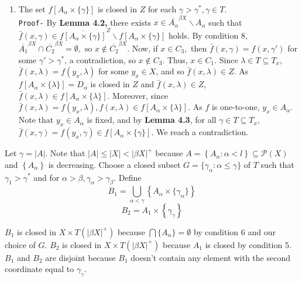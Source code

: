 \documentclass{article}
\begin{document}
\begin{enumerate}
																																																			    \item The set $f\left[A_\alpha\times\{\gamma\}\right]$ is closed in $Z$ for each $\gamma>\gamma^*, \gamma\in T$.\\
																																																				\texttt{Proof-} By \textbf{Lemma 4.2,} there exists $x\in \overline{A_\alpha}^{\beta X}\backslash A_\alpha$ such that $\bar{f}(x,\gamma)\in \overline{f\left[A_\alpha\times\{\gamma\}\right]}^Z \backslash f\left[A_\alpha\times \{\gamma\}\right]$ holds. By condition 8, $\overline{A_1}^{\beta X} \cap \overline{C_2}^{\beta X}=\emptyset, \mbox{ so }x\notin \overline{C_2}^{\beta X}.$ Now, if $x\in C_3,$ then $\bar{f}(x,\gamma)=f(x,\gamma')$ for some $\gamma'>\gamma^*$, a contradiction, so $x\notin C_3$. Thus, $x\in C_1.$ Since $\lambda \in T\subseteq T_x,$ $\bar{f}(x,\lambda)=f(y_x,\lambda)$ for some $y_x\in X$, and so $\bar{f}(x,\lambda)\in Z$. As $f\left[A_\alpha\times\{\lambda\}\right]=D_\alpha$ is closed in $Z$ and $\bar{f}(x,\lambda)\in Z$, $\bar{f}(x,\lambda)\in f\left[A_\alpha \times \{\lambda\}\right].$ Moreover, since $\bar{f}(x,\lambda)=f(y_x, \lambda), f(x,\lambda)\in f\left[A_\alpha \times \{\lambda\}\right].$ As $f$ is one-to-one, $y_x\in A_\alpha$. Note that $y_x\in A_\alpha$ is fixed, and by \textbf{Lemma 4.3}, for all $\gamma \in T\subseteq T_x,$ $\bar{f}(x,\gamma)=f(y_x,\gamma)\in f\left[A_\alpha \times \{\gamma\}\right].$ We reach a contradiction.

																																																				\end{enumerate}



																																																				\vskip 30pt


																																																				Let $\gamma=|A|$. Note that $|A|\leq |X|<|\beta X|^+$ because $A=\left\{A_\alpha: \alpha< l\right\} \subseteq \mathcal{P}(X)$ and $\left\{A_\alpha\right\}$ is decreasing. 
																																																				Choose a closed subset $G=\{\gamma_\alpha: \alpha\leq \gamma\}$ of $T$ such that $\gamma_1>\gamma^*$ and for $\alpha>\beta, \gamma_\alpha>\gamma_\beta$. Define 
																																																				$$B_1=\bigcup_{\alpha<\gamma} \left\{A_\alpha\times \{\gamma_\alpha\}\right\}$$
																																																				$$B_2=A_1\times \left\{\gamma_{\gamma}\right\}$$ \vskip 5pt

																																																				$B_1$ is closed in $X\times T(|\beta X|^+)$ because $\bigcap \{A_\alpha\}=\emptyset$ by condition 6 and our choice of $G$. $B_2$ is closed in $X\times T(|\beta X|^+)$ because $A_1$ is closed by condition 5. $B_1$ and $B_2$ are disjoint because $B_1$ doesn't contain any element with the second coordinate equal to $\gamma_\gamma$.
\end{document}
